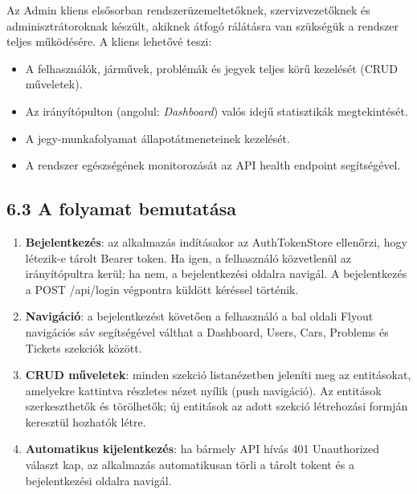 Az Admin kliens elsősorban rendszerüzemeltetőknek, szervizvezetőknek és adminisztrátoroknak készült, akiknek átfogó rálátásra van szükségük a rendszer teljes működésére. A kliens lehetővé teszi:

\begin{itemize}
\item
  A felhasználók, járművek, problémák és jegyek teljes körű kezelését (CRUD műveletek).
\item
  Az irányítópulton (angolul: \emph{Dashboard}) valós idejű statisztikák megtekintését.
\item
  A jegy-munkafolyamat állapotátmeneteinek kezelését.
\item
  A rendszer egészségének monitorozását az API health endpoint segítségével.
\end{itemize}

\section{6.3 A folyamat bemutatása}\label{a-folyamat-bemutatuxe1sa}

\begin{enumerate}
\def\labelenumi{\arabic{enumi}.}
\item
  \textbf{Bejelentkezés}: az alkalmazás indításakor az AuthTokenStore ellenőrzi, hogy létezik-e tárolt Bearer token. Ha igen, a felhasználó közvetlenül az irányítópultra kerül; ha nem, a bejelentkezési oldalra navigál. A bejelentkezés a POST /api/login végpontra küldött kéréssel történik.
\item
  \textbf{Navigáció}: a bejelentkezést követően a felhasználó a bal oldali Flyout navigációs sáv segítségével válthat a Dashboard, Users, Cars, Problems és Tickets szekciók között.
\item
  \textbf{CRUD műveletek}: minden szekció listanézetben jeleníti meg az entitásokat, amelyekre kattintva részletes nézet nyílik (push navigáció). Az entitások szerkeszthetők és törölhetők; új entitások az adott szekció létrehozási formján keresztül hozhatók létre.
\item
  \textbf{Automatikus kijelentkezés}: ha bármely API hívás 401 Unauthorized választ kap, az alkalmazás automatikusan törli a tárolt tokent és a bejelentkezési oldalra navigál.
\end{enumerate}

\chapter{}\label{section-2}

